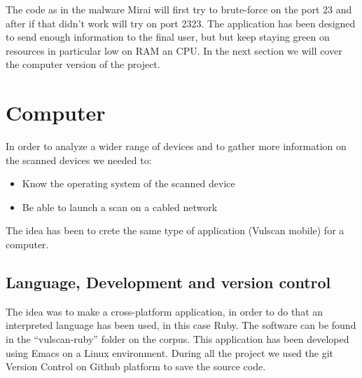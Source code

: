 \documentclass{report}
\begin{document}
The code as in the malware Mirai will first try to brute-force on the port 23 and after if that didn't work will try on port 2323.\newline
The application has been designed to send enough information to the final user, but but keep staying green on resources in particular low on RAM an CPU.\newline
In the next section we will cover the computer version of the project.

\section{Computer}
In order to analyze a wider range of devices and to gather more information on the scanned devices we needed to:
\begin{itemize}
 \item Know the operating system of the scanned device
 \item Be able to launch a scan on a cabled network
\end{itemize}
The idea has been to crete the same type of application (Vulscan mobile) for a computer.

\subsection{Language, Development and version control}
The idea was to make a cross-platform application, in order to do that an interpreted language has been used, in this case Ruby\autocite{ruby}.
The software can be found in the ``vulscan-ruby'' folder on the corpus. This application has been developed using Emacs\autocite{emacs} on a Linux environment.\newline
During all the project we used the git Version Control on Github\autocite{github} platform to save the source code.
\end{document}
